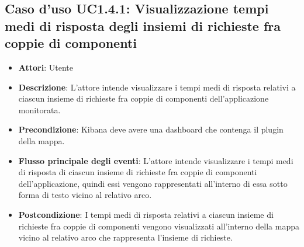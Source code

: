 \subsection{Caso d'uso UC1.4.1: Visualizzazione tempi medi di risposta degli insiemi di richieste fra coppie di componenti}
\begin{itemize}
	\item \textbf{Attori}: Utente
	\item \textbf{Descrizione}: L'attore intende visualizzare i tempi medi di risposta relativi a ciascun insieme di richieste fra coppie di componenti dell'applicazione monitorata.
	
	\item \textbf{Precondizione}: Kibana deve avere una dashboard che contenga il plugin della mappa.
	\item \textbf{Flusso principale degli eventi}: L'attore intende visualizzare i tempi medi di risposta di ciascun insieme di richieste fra coppie di componenti dell'applicazione, quindi essi vengono rappresentati all'interno di essa sotto forma di testo vicino al relativo arco.
	\item \textbf{Postcondizione}: I tempi medi di risposta relativi a ciascun insieme di richieste fra coppie di componenti vengono visualizzati all'interno della mappa vicino al relativo arco che rappresenta l'insieme di richieste.
\end{itemize}
